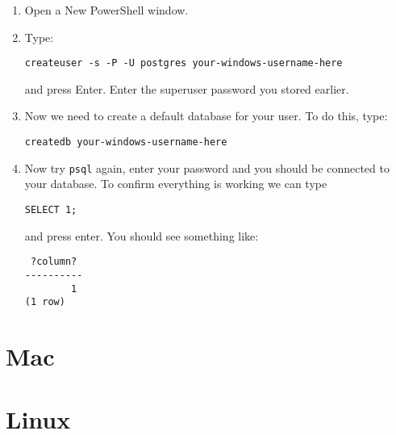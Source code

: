\begin{enumerate}

\item
	Open a New PowerShell window.

\item
  Type:
\begin{verbatim}
createuser -s -P -U postgres your-windows-username-here
\end{verbatim}
  and press Enter. 
  Enter the superuser password you stored earlier.

\item
  Now we need to create a default database for your user.
  To do this, type:
\begin{verbatim}
createdb your-windows-username-here
\end{verbatim}
	
\item 
  Now try \texttt{psql} again, enter your password and you should be connected to your database.
  To confirm everything is working we can type
\begin{verbatim}
SELECT 1;
\end{verbatim}
  and press enter.
  You should see something like:
\begin{verbatim}
 ?column?
----------
        1
(1 row)
\end{verbatim}

\end{enumerate}


\section{Mac}
\label{sec:postgresql-setup-mac}

\section{Linux}
\label{sec:postgresql-setup-linux}

